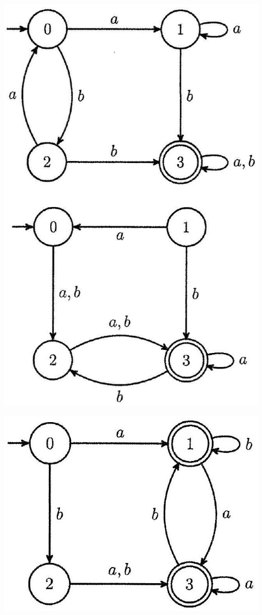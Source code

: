 \documentclass[10pt]{article}
\begin{document}
\includegraphics[max width=\textwidth, center]{2024_05_29_35588a07a9630e5c9887g-4(1)}

\begin{center}
\includegraphics[max width=\textwidth]{2024_05_29_35588a07a9630e5c9887g-5}
\end{center}
\end{document}

